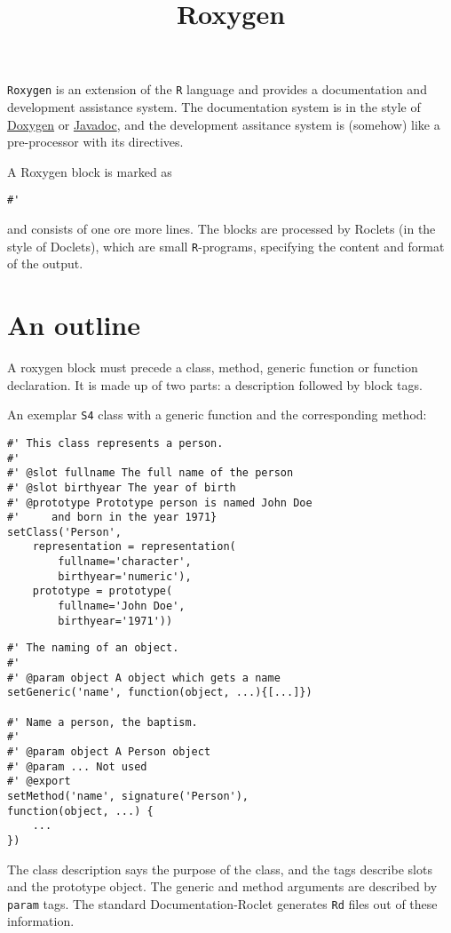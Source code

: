 \documentclass{mjaeartcl}
\begin{document}
\title{Roxygen}

\makewptitle

\texttt{Roxygen} is an extension of the \texttt{R} language and
provides a documentation and development assistance system. The
documentation system is in the style of
\href{http://www.stack.nl/~dimitri/doxygen/}{Doxygen} or
\href{http://java.sun.com/j2se/javadoc/}{Javadoc}, and the development
assitance system is (somehow) like a pre-processor with its
directives.

A Roxygen block is marked as
\begin{lstlisting}
#'
\end{lstlisting}
and consists of one ore more lines. The blocks are processed by
Roclets (in the style of Doclets), which are small
\texttt{R}-programs, specifying the content and format of the output.


\section*{An outline}

A roxygen block must precede a class, method, generic function or
function declaration. It is made up of two parts: a description
followed by block tags.

An exemplar \texttt{S4} class with a generic function and the
corresponding method:

\begin{lstlisting}
#' This class represents a person.
#' 
#' @slot fullname The full name of the person
#' @slot birthyear The year of birth
#' @prototype Prototype person is named John Doe
#'     and born in the year 1971}
setClass('Person',
	representation = representation(
		fullname='character',
		birthyear='numeric'),
	prototype = prototype(
		fullname='John Doe',
		birthyear='1971'))
\end{lstlisting}

\begin{lstlisting}
#' The naming of an object.
#'
#' @param object A object which gets a name
setGeneric('name', function(object, ...){[...]})

#' Name a person, the baptism.
#'
#' @param object A Person object
#' @param ... Not used
#' @export
setMethod('name', signature('Person'),
function(object, ...) {
	...
})
\end{lstlisting}

The class description says the purpose of the class, and the tags
describe slots and the prototype object. The generic and method
arguments are described by \texttt{param} tags. The standard
Documentation-Roclet generates \texttt{Rd} files out of these
information.
\end{document}
